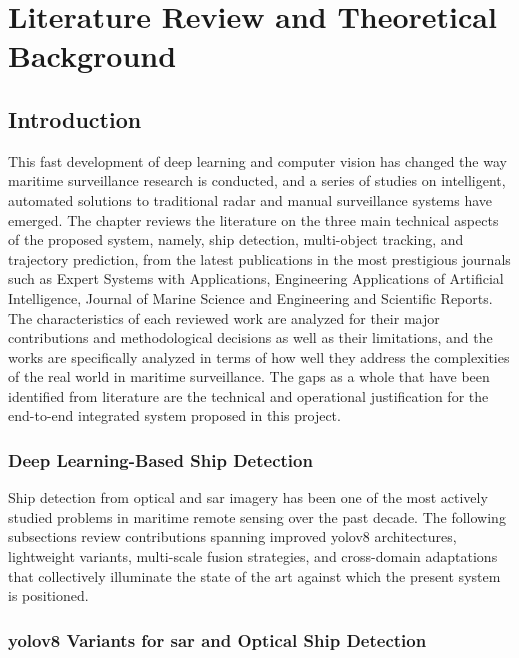 \chapter{Literature Review and Theoretical Background}

\section{Introduction}
This fast development of deep learning and computer vision has changed the way maritime surveillance research is conducted, and a series of studies on intelligent, automated solutions to traditional radar and manual surveillance systems have emerged. The chapter reviews the literature on the three main technical aspects of the proposed system, namely, ship detection, multi-object tracking, and trajectory prediction, from the latest publications in the most prestigious journals such as Expert Systems with Applications, Engineering Applications of Artificial Intelligence, Journal of Marine Science and Engineering and Scientific Reports. The characteristics of each reviewed work are analyzed for their major contributions and methodological decisions as well as their limitations, and the works are specifically analyzed in terms of how well they address the complexities of the real world in maritime surveillance. The gaps as a whole that have been identified from literature are the technical and operational justification for the end-to-end integrated system proposed in this project.

\subsection{Deep Learning-Based Ship Detection}
Ship detection from optical and \gls{sar} imagery has been one of the most actively studied problems in maritime remote sensing over the past decade. The following subsections review contributions spanning improved \gls{yolov8} architectures, lightweight variants, multi-scale fusion strategies, and cross-domain adaptations that collectively illuminate the state of the art against which the present system is positioned.
 
\subsection{\textbf{\texorpdfstring{\gls{yolov8}}{YOLOv8} Variants for \texorpdfstring{\gls{sar}}{SAR} and Optical Ship Detection}}
 
